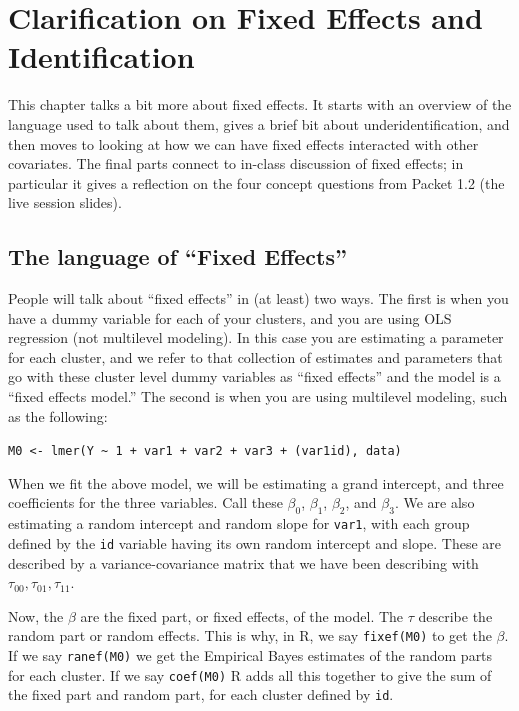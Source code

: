\documentclass[
  letterpaper,
  DIV=11,
  numbers=noendperiod]{scrreprt}
\begin{document}
\hypertarget{clarification-on-fixed-effects-and-identification}{%
\chapter{Clarification on Fixed Effects and
Identification}\label{clarification-on-fixed-effects-and-identification}}

This chapter talks a bit more about fixed effects. It starts with an
overview of the language used to talk about them, gives a brief bit
about underidentification, and then moves to looking at how we can have
fixed effects interacted with other covariates. The final parts connect
to in-class discussion of fixed effects; in particular it gives a
reflection on the four concept questions from Packet 1.2 (the live
session slides).

\hypertarget{the-language-of-fixed-effects}{%
\section{The language of ``Fixed
Effects''}\label{the-language-of-fixed-effects}}

People will talk about ``fixed effects'' in (at least) two ways. The
first is when you have a dummy variable for each of your clusters, and
you are using OLS regression (not multilevel modeling). In this case you
are estimating a parameter for each cluster, and we refer to that
collection of estimates and parameters that go with these cluster level
dummy variables as ``fixed effects'' and the model is a ``fixed effects
model.'' The second is when you are using multilevel modeling, such as
the following:

\texttt{M0\ \textless{}-\ lmer(Y\ \textasciitilde{}\ 1\ +\ var1\ +\ var2\ +\ var3\ +\ (var1\textbar{}id),\ data)}

When we fit the above model, we will be estimating a grand intercept,
and three coefficients for the three variables. Call these \(\beta_0\),
\(\beta_1\), \(\beta_2\), and \(\beta_3\). We are also estimating a
random intercept and random slope for \texttt{var1}, with each group
defined by the \texttt{id} variable having its own random intercept and
slope. These are described by a variance-covariance matrix that we have
been describing with \(\tau_{00}, \tau_{01}, \tau_{11}\).

Now, the \(\beta\) are the fixed part, or fixed effects, of the model.
The \(\tau\) describe the random part or random effects. This is why, in
R, we say \texttt{fixef(M0)} to get the \(\beta\). If we say
\texttt{ranef(M0)} we get the Empirical Bayes estimates of the random
parts for each cluster. If we say \texttt{coef(M0)} R adds all this
together to give the sum of the fixed part and random part, for each
cluster defined by \texttt{id}.
\end{document}
